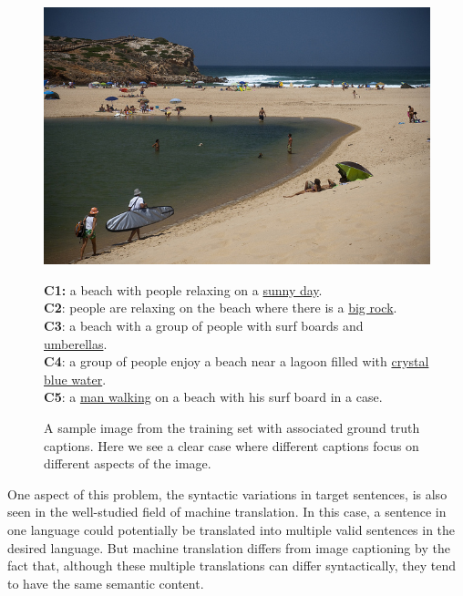 \begin{figure}[h]
    \begin{minipage}[c]{0.45\linewidth}
            \includegraphics[width=\textwidth]{images/COCO_train2014_000000440903.jpg}
    \end{minipage}\hfill
    \begin{minipage}[c]{0.52\linewidth}
            \textbf{C1:} a beach with people relaxing on a \underline{sunny day}. \\
            \textbf{C2}: people are relaxing on the beach where there is a \underline{big rock}. \\
            \textbf{C3}: a beach with a group of people with surf boards and \underline{umberellas}. \\
            \textbf{C4}: a group of people enjoy a beach near a lagoon filled with \underline{crystal blue
            water}. \\
            \textbf{C5}: a \underline{man walking} on a beach with his surf board in a case. \\
    \end{minipage}
  \vspace*{-3mm}
  \caption{ A sample image from the training set with associated ground truth
  captions. Here we see a clear case where different captions focus on different
  aspects of the image.
  }
  \label{fig_capdiversity}
\end{figure}

One aspect of this problem, the syntactic variations in target sentences, is also
seen in the well-studied field of machine translation.
In this case, a sentence in one language could potentially be translated into
multiple valid sentences in the desired language.
But machine translation differs from image captioning by the fact that, although
these multiple translations can differ syntactically, they tend to have the same
semantic content.


